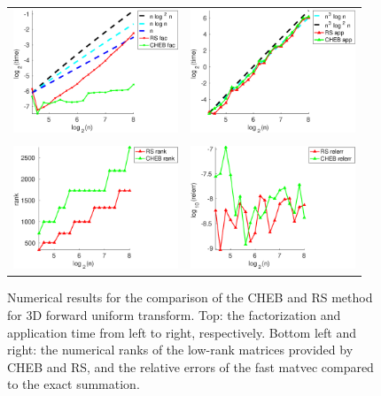 \documentclass[11pt]{article}
\begin{document}
\begin{figure}
  \begin{center}
    \begin{tabular}{cc}
      \includegraphics[height=1.45in]{pic/Comp_RSFFT_CHEBNF_uni2_3D.eps}&
      \includegraphics[height=1.45in]{pic/Comp_RSFFT_CHEBNF_uni1_3D.eps}\\
      \\
      \includegraphics[height=1.45in]{pic/CompFN_rank_uni_3D.eps}&
      \includegraphics[height=1.45in]{pic/CompFN_relerr_uni_3D.eps}\\
    \end{tabular}
  \end{center}
\caption{Numerical results for the comparison of the CHEB and RS method for 3D forward uniform transform. Top: the factorization and application time {\color{blue}{(in second)}} from left to right, respectively. Bottom left and right: the numerical ranks of the low-rank matrices provided by CHEB and RS, and the relative errors of the fast matvec compared to the exact summation.}
\label{fig:comp3}
\end{figure}
 
\end{document}
